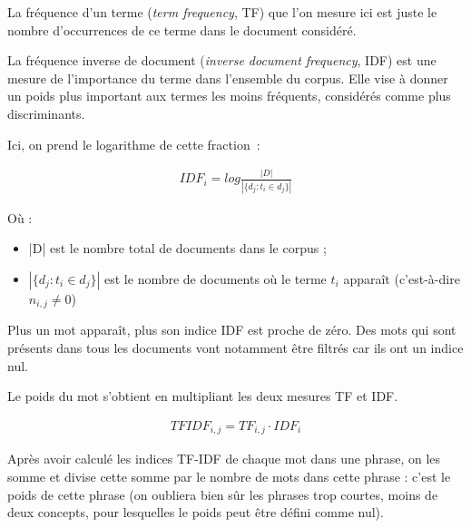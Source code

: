 \documentclass[a4paper, 12pt]{article}
\begin{document}
\begin{definition}[TF]
 La fréquence d'un terme (\textit{term frequency}, TF) que l'on mesure ici est juste le nombre d'occurrences de ce terme dans le document considéré.
\end{definition}

\begin{definition}[IDF]
 La fréquence inverse de document (\textit{inverse document frequency}, IDF) est une mesure de l'importance du terme dans l'ensemble du corpus. Elle vise à donner un poids plus important aux termes les moins fréquents, considérés comme plus discriminants.
\end{definition}

Ici, on prend le logarithme de cette fraction~:

\begin{align}
 IDF_{i} =  log \frac{|D|}{|\{d_{j}: t_{i} \in d_{j}\}|}
\end{align}

Où : 
\begin{itemize}
 \item |D| est le nombre total de documents dans le corpus ;
 \item $|\{d_{j} : t_{i} \in d_{j}\}|$ est le nombre de documents où le terme  $t_{i}$  apparaît (c'est-à-dire  $n_{i,j} \neq 0$)
\end{itemize}

Plus un mot apparaît, plus son indice IDF est proche de zéro. Des mots qui sont présents dans tous les documents vont notamment être filtrés car ils ont un indice nul.

\begin{definition}[TF-IDF]
Le poids du mot s'obtient en multipliant les deux mesures TF et IDF.
\end{definition}

\begin{align}
 TFIDF_{i,j} = TF_{i,j} \cdot  IDF_{i}
\end{align}

\begin{definition}
Après avoir calculé les indices TF-IDF de chaque mot dans une phrase, on les somme et divise cette somme par le nombre de mots dans cette phrase : c'est le poids de cette phrase (on oubliera bien sûr les phrases trop courtes, moins de deux concepts, pour lesquelles le poids peut être défini comme nul).
\end{definition}
\end{document}
